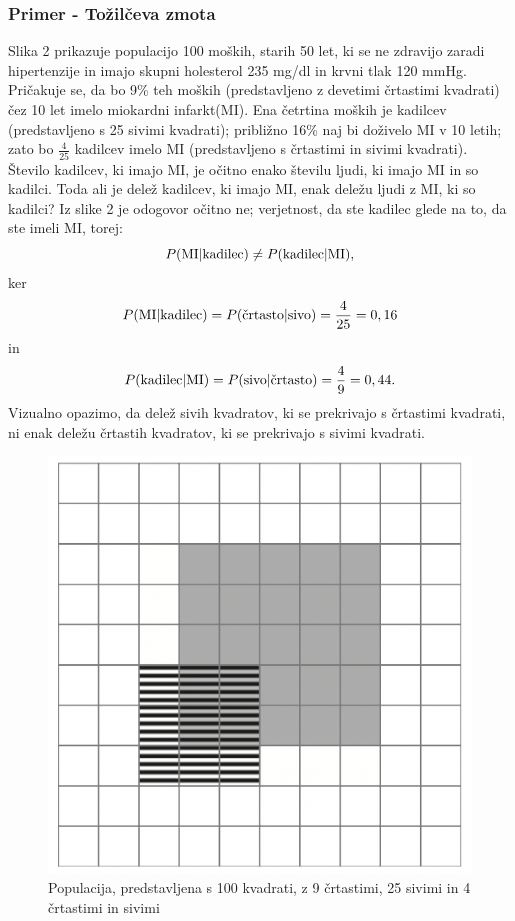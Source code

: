 \documentclass[12pt,a4paper]{amsart}
\theoremstyle{definition} %
\theoremstyle{plain} %
\begin{document}
\subsubsection{Primer - Tožilčeva zmota}
Slika 2 prikazuje populacijo 100 moških, starih 50 let, ki se ne zdravijo zaradi hipertenzije in imajo skupni holesterol 235 mg/dl in krvni tlak 120 mmHg. Pričakuje
se, da bo 9\% teh moških (predstavljeno z devetimi črtastimi kvadrati) čez 10 let imelo miokardni infarkt(MI). Ena četrtina moških je kadilcev (predstavljeno s 25
sivimi kvadrati); približno 16\% naj bi doživelo MI v 10 letih; zato bo $\frac{4}{25}$ kadilcev imelo MI (predstavljeno s črtastimi in sivimi kvadrati). \\
Število kadilcev, ki imajo MI, je očitno enako številu ljudi, ki imajo MI in so kadilci. Toda ali je delež kadilcev, ki imajo MI, enak deležu ljudi z MI, ki so kadilci? Iz
slike 2 je odogovor očitno ne; verjetnost, da ste kadilec glede na to, da ste imeli MI, torej:
\[
   P(\text{MI} \lvert \text{kadilec}) \ne P(\text{kadilec} \lvert \text{MI}), \vspace{2mm}
\]
ker
\[
   P(\text{MI} \lvert \text{kadilec}) = P(\text{črtasto} \lvert \text{sivo}) = \frac{4}{25} = 0,16 \vspace{2mm}
\]
in
\[
   P(\text{kadilec} \lvert \text{MI}) = P(\text{sivo} \lvert \text{črtasto}) = \frac{4}{9} = 0,44. \vspace{2mm}
\]
Vizualno opazimo, da delež sivih kvadratov, ki se prekrivajo s črtastimi kvadrati, ni enak deležu črtastih kvadratov, ki se prekrivajo s sivimi kvadrati.
\begin{figure}[!ht]\label{fig:slika1}
   \centering
   \includegraphics[scale=0.45]{slika1.png}
   \caption{Populacija, predstavljena s 100 kvadrati, z 9 črtastimi, 25 sivimi in 4 črtastimi in sivimi}\vspace{2mm}
\end{figure}\\
\end{document}

